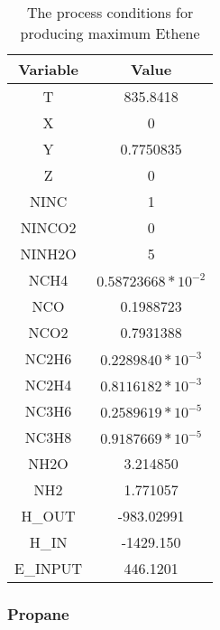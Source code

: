 \documentclass[journal=iecred,manuscript=article]{achemso}
\begin{document}
\FloatBarrier
\begin{table}[H]
\caption{The process conditions for producing maximum Ethene} 
\centering
\begin{tabular}{|c|c|}
\hline\hline %
Variable & Value \\ 
[1ex] %
\hline %
T	&  835.8418 \\
\hline
X	 & 0 \\
\hline
Y	& 0.7750835 \\
\hline
Z	&  0 \\
\hline
NINC	& 1 \\
\hline
NINCO2	& 0 \\
\hline
NINH2O	&  5 \\
\hline
NCH4 &	 $0.58723668*10^{-2}$ \\
\hline
NCO	& 0.1988723  \\
\hline
NCO2	& 0.7931388  \\
\hline
NC2H6	& $0.2289840*10^{-3}$ \\
\hline
NC2H4	& $0.8116182*10^{-3}$ \\
\hline
NC3H6	& $0.2589619*10^{-5}$ \\
\hline
NC3H8	& $0.9187669*10^{-5}$ \\
\hline
NH2O	& 3.214850   \\
\hline
NH2 & 1.771057  \\
\hline
H_{OUT}	& -983.02991  \\
\hline
H_{IN}	& -1429.150   \\
\hline
E_{INPUT}	& 446.1201 \\
\hline 
\end{tabular}
\end{table}
\FloatBarrier

\newpage
\subsubsection{Propane}
\end{document}
